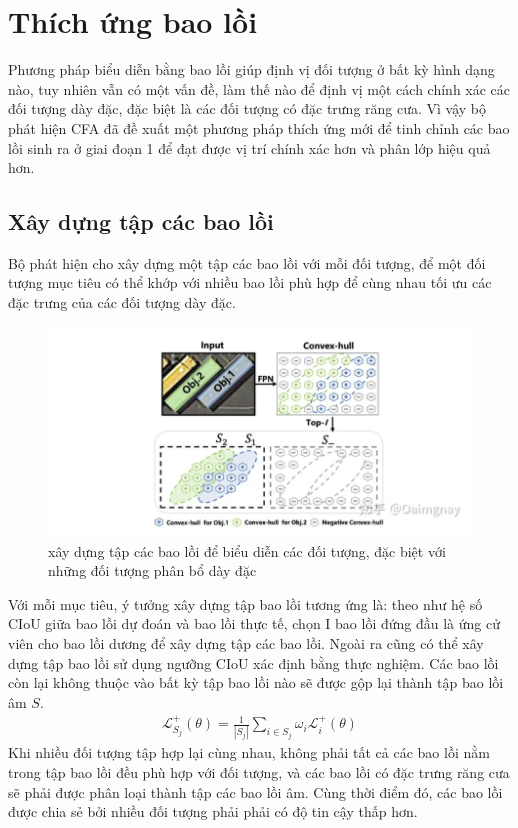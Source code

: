 \documentclass[12pt,a4paper,openany,oneside]{report}
\begin{document}
\section{Thích ứng bao lồi}
Phương pháp biểu diễn bằng bao lồi giúp định vị đối tượng ở bất kỳ hình dạng nào, tuy nhiên vẫn có một vấn đề, làm thế nào để định vị một cách chính xác các đối tượng dày đặc, đặc biệt là các đối tượng có đặc trưng răng cưa. Vì vậy bộ phát hiện CFA đã đề xuất một phương pháp thích ứng mới để tinh chỉnh các bao lồi sinh ra ở giai đoạn 1 để đạt được vị trí chính xác hơn và phân lớp hiệu quả hơn.
\subsection{Xây dựng tập các bao lồi}
Bộ phát hiện cho xây dựng một tập các bao lồi với mỗi đối tượng, để một đối tượng mục tiêu có thể khớp với nhiều bao lồi phù hợp để cùng nhau tối ưu các đặc trưng của các đối tượng dày đặc.

\begin{figure}[ht!]
	\begin{center}
		\includegraphics[width=445px]{./construction_convex_hull_set.jpg}
		\caption{xây dựng tập các bao lồi để biểu diễn các đối tượng, đặc biệt với những đối tượng phân bổ dày đặc}
		\label{fig_dhandang1}
	\end{center}
\end{figure} 
Với mỗi mục tiêu, ý tưởng xây dựng tập bao lồi tương ứng là: theo như hệ số CIoU giữa bao lồi dự đoán và bao lồi thực tế, chọn I bao lồi đứng đầu là ứng cử viên cho bao lồi dương để xây dựng tập các bao lồi. Ngoài ra cũng có thể xây dựng tập bao lồi sử dụng ngưỡng CIoU xác định bằng thực nghiệm. Các bao lồi còn lại không thuộc vào bất kỳ tập bao lồi nào sẽ được gộp lại thành tập bao lồi âm $S$.
\begin{align} \label{construct_convex_hull_set}
\mathcal{L}_{S_j}^{+}(\theta)=\frac{1}{\left|S_j\right|} \sum_{i \in S_j} \omega_i \mathcal{L}_i^{+}(\theta)
\end{align}
Khi nhiều đối tượng tập hợp lại cùng nhau, không phải tất cả các bao lồi nằm trong tập bao lồi đều phù hợp với đối tượng, và các bao lồi có đặc trưng răng cưa sẽ phải được phân loại thành tập các bao lồi âm. Cùng thời điểm đó, các bao lồi được chia sẻ bởi nhiều đối tượng phải phải có độ tin cậy thấp hơn.
\end{document}

